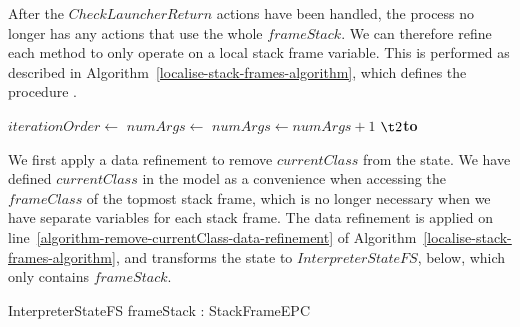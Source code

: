 After the $CheckLauncherReturn$ actions have been handled, the process
no longer has any actions that use the whole $frameStack$.
We can therefore refine each method to only operate on a local stack
frame variable.
This is performed as described in
Algorithm~\ref{localise-stack-frames-algorithm}, which defines the
procedure .

\begin{algorithm}[t]
  \begin{algorithmic}[1]
    \arraycolsep=0cm
    \State {}
    \label{algorithm-remove-currentClass-data-refinement}
    \State $iterationOrder \gets$ 
    \label{algorithm-method-dependency-order-call}
    \label{algorithm-localise-stack-frames-loop}
    \State $numArgs \gets$ 
    \label{algorithm-numArgs-declaration}
    \label{algorithm-static-args-check-start}
    \State $numArgs \gets numArgs + 1$
    \EndIf
    \label{algorithm-static-args-check-end}
    \State {}
    \label{algorithm-arguments-introduction}
    \State {}
    \label{algorithm-redefine-method-action-to-include-parameters}
    \State {}
    \label{algorithm-HandleReturnEPC-stackFrame-introduction-rule}
    \Statex $\t2${\bf to} {}
    \EndFor
  \end{algorithmic}
  \caption{}
  \label{localise-stack-frames-algorithm}
\end{algorithm}
 
We first apply a data refinement to remove $currentClass$ from the
state.
We have defined $currentClass$ in the model as a convenience when
accessing the $frameClass$ of the topmost stack frame, which is no
longer necessary when we have separate variables for each stack frame.
The data refinement is applied on
line~\ref{algorithm-remove-currentClass-data-refinement} of
Algorithm~\ref{localise-stack-frames-algorithm}, and transforms the
state to $InterpreterStateFS$, below, which only contains
$frameStack$.
\begin{schema}{InterpreterStateFS}
  frameStack : \seq StackFrameEPC
\end{schema}

